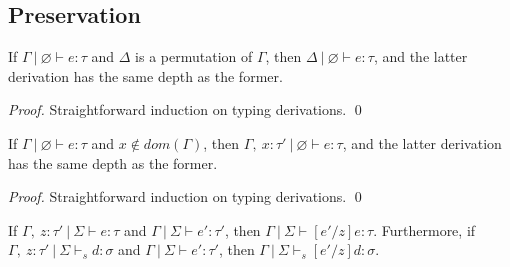 \documentclass{llncs}
\begin{document}
\subsection{Preservation}

\begin{lemma}[Permutation]
If $\Gamma~|~\varnothing \vdash e : \tau$ and $\Delta$ is a permutation of $\Gamma$, then $\Delta~|~\varnothing \vdash e : \tau$, and the latter derivation has the same depth as the former.
\end{lemma}

\begin{proof}
Straightforward induction on typing derivations. \qed
\end{proof}

\vspace{8pt}

\begin{lemma}[Weakening]
If $\Gamma~|~\varnothing \vdash e : \tau$ and $x \not\in dom(\Gamma)$, then $\Gamma,~x : \tau'~|~\varnothing \vdash e : \tau$, and the latter derivation has the same depth as the former.
\end{lemma}

\begin{proof}
Straightforward induction on typing derivations. \qed
\end{proof}

\vspace{8pt}

\begin{lemma}
If $\Gamma,~z : \tau'~|~\Sigma \vdash e : \tau$ and $\Gamma~|~\Sigma \vdash e' : \tau'$, then $\Gamma~|~\Sigma \vdash [e'/z]e : \tau$. Furthermore, if $\Gamma,~z : \tau'~|~\Sigma \vdash_s d : \sigma$ and $\Gamma~|~\Sigma \vdash e' : \tau'$, then $\Gamma~|~\Sigma \vdash_s [e'/z]d : \sigma$.
\end{lemma}
\end{document}

